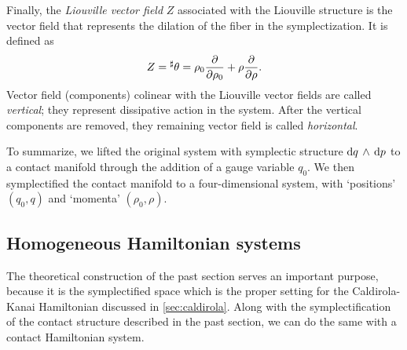 Finally, the \emph{Liouville vector field} $Z$ associated with the Liouville structure is the vector field that represents the dilation of the fiber in the symplectization. It is defined as
\begin{equation}
    Z = {}^\sharp\theta = \rho_0\pdv{}{\rho_0} + \rho\pdv{}{\rho}. 
    \label{eq:liouville_vf}
\end{equation}
Vector field (components) colinear with the Liouville vector fields are called \emph{vertical}; they represent dissipative action in the system. After the vertical components are removed, they remaining vector field is called \emph{horizontal}.

To summarize, we lifted the original system with symplectic structure $ \dd{q}\,\wedge\,\dd{p} $ to a contact manifold through the addition of a gauge variable $q_0$. We then symplectified the contact manifold to a four-dimensional system, with `positions' $(q_0, q)$ and `momenta' $(\rho_0, \rho)$.

\subsection{Homogeneous Hamiltonian systems} The theoretical construction of the past section serves an important purpose, because it is the symplectified space which is the proper setting for the Caldirola-Kanai Hamiltonian discussed in \cref{sec:caldirola}. Along with the symplectification of the contact structure described in the past section, we can do the same with a contact Hamiltonian system.

